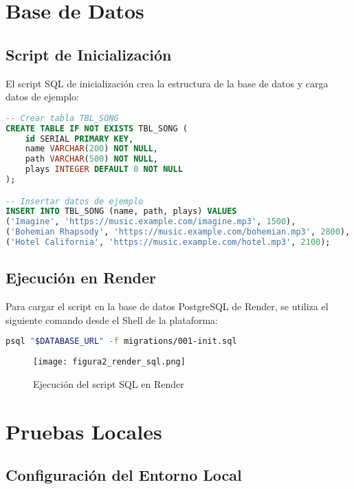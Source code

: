 \documentclass[12pt,a4paper]{article}
\begin{document}
\section{Base de Datos}

\subsection{Script de Inicialización}

El script SQL de inicialización crea la estructura de la base de datos y carga datos de ejemplo:

\begin{lstlisting}[language=SQL, caption=Script de inicialización de la base de datos]
-- Crear tabla TBL_SONG
CREATE TABLE IF NOT EXISTS TBL_SONG (
    id SERIAL PRIMARY KEY,
    name VARCHAR(200) NOT NULL,
    path VARCHAR(500) NOT NULL,
    plays INTEGER DEFAULT 0 NOT NULL
);

-- Insertar datos de ejemplo
INSERT INTO TBL_SONG (name, path, plays) VALUES 
('Imagine', 'https://music.example.com/imagine.mp3', 1500),
('Bohemian Rhapsody', 'https://music.example.com/bohemian.mp3', 2800),
('Hotel California', 'https://music.example.com/hotel.mp3', 2100);
\end{lstlisting}

\subsection{Ejecución en Render}

Para cargar el script en la base de datos PostgreSQL de Render, se utiliza el siguiente comando desde el Shell de la plataforma:

\begin{lstlisting}[language=bash]
psql "$DATABASE_URL" -f migrations/001-init.sql
\end{lstlisting}

\begin{figure}[H]
\centering
\texttt{[image: figura2\_render\_sql.png]}
\caption{Ejecución del script SQL en Render}
\end{figure}

\section{Pruebas Locales}

\subsection{Configuración del Entorno Local}
\end{document}
